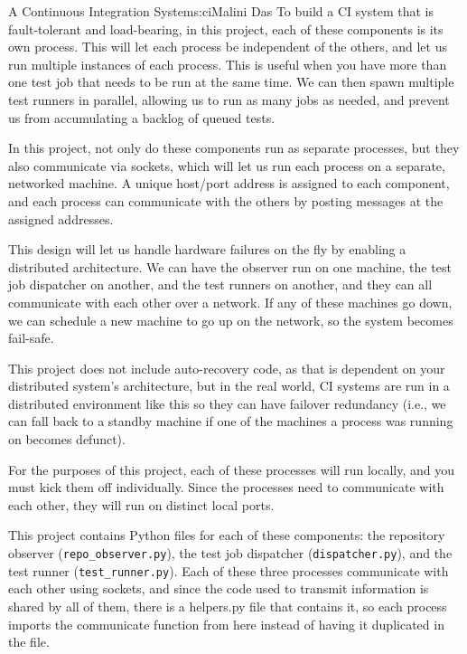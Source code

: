 \begin{aosachapter}{A Continuous Integration System}{s:ci}{Malini Das}
To build a CI system that is fault-tolerant and load-bearing, in this
project, each of these components is its own process. This will let each
process be independent of the others, and let us run multiple instances
of each process. This is useful when you have more than one test job
that needs to be run at the same time. We can then spawn multiple test
runners in parallel, allowing us to run as many jobs as needed, and
prevent us from accumulating a backlog of queued tests.

In this project, not only do these components run as separate processes,
but they also communicate via sockets, which will let us run each
process on a separate, networked machine. A unique host/port address is
assigned to each component, and each process can communicate with the
others by posting messages at the assigned addresses.

This design will let us handle hardware failures on the fly by enabling
a distributed architecture. We can have the observer run on one machine,
the test job dispatcher on another, and the test runners on another, and
they can all communicate with each other over a network. If any of these
machines go down, we can schedule a new machine to go up on the network,
so the system becomes fail-safe.

This project does not include auto-recovery code, as that is dependent
on your distributed system's architecture, but in the real world, CI
systems are run in a distributed environment like this so they can have
failover redundancy (i.e., we can fall back to a standby machine if one
of the machines a process was running on becomes defunct).

For the purposes of this project, each of these processes will run
locally, and you must kick them off individually. Since the processes
need to communicate with each other, they will run on distinct local
ports.

\label{files-in-this-project}

This project contains Python files for each of these components: the
repository observer \newline (\texttt{repo\_observer.py}), the test job
dispatcher (\texttt{dispatcher.py}), and the test runner
\newline (\texttt{test\_runner.py}). Each of these three processes
communicate with each other using sockets, and since the code used to
transmit information is shared by all of them, there is a helpers.py
file that contains it, so each process imports the communicate function
from here instead of having it duplicated in the file.


\end{aosachapter}
